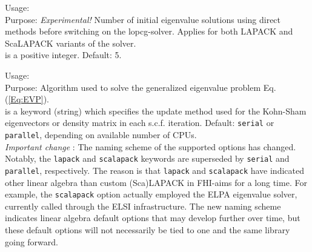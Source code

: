 {
  \noindent
  Usage:   \\[1.0ex]
  Purpose: \emph{Experimental!} Number of initial eigenvalue solutions using
    direct methods before switching on the lopcg-solver. Applies for both
    LAPACK and ScaLAPACK variants of the solver. \\[1.0ex]
   is a positive integer. Default: 5. \\
}

{
  \noindent
  Usage:   \\[1.0ex]
  Purpose: Algorithm used to solve the generalized eigenvalue problem
    Eq. (\ref{Eq:EVP}). \\[1.0ex]
   is a keyword (string) which specifies the update method used
    for the Kohn-Sham eigenvectors or density matrix in each s.c.f. iteration.
    Default: \texttt{serial} or \texttt{parallel}, depending on available number
    of CPUs. \\
}
\emph{Important change} : The naming scheme of the supported options has
changed. Notably, the \texttt{lapack} and \texttt{scalapack} keywords are
superseded by \texttt{serial} and \texttt{parallel}, respectively. The reason is
that \texttt{lapack} and \texttt{scalapack} have indicated other linear algebra
than custom (Sca)LAPACK in FHI-aims for a long time. For example, the
\texttt{scalapack} option actually employed the ELPA eigenvalue solver,
currently called through the ELSI infrastructure. The new naming scheme
indicates linear algebra default options that may develop further over time, but
these default options will not necessarily be tied to one and the same library
going forward.


